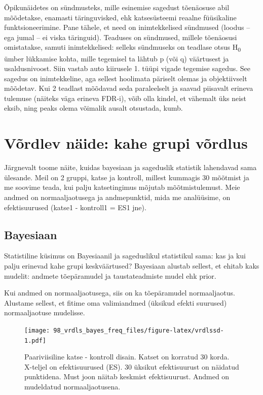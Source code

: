\documentclass[]{book}
\begin{document}
Õpikunäidetes on sündmusteks, mille esinemise sagedust tõenäosuse abil mõõdetakse, enamasti täringuvisked, ehk katsesüsteemi reaalne füüsikaline funktsioneerimine.
Pane tähele, et need on inimtekkelised sündmused (loodus -- ega jumal -- ei viska täringuid).
Teaduses on sündmused, millele tõenäosusi omistatakse, samuti inimtekkelised: selleks sündmuseks on teadlase otsus H\textsubscript{0} ümber lükkamise kohta, mille tegemisel ta lähtub p (või q) väärtusest ja usaldusnivoost.
Siin vastab auto kiirusele 1. tüüpi vigade tegemise sagedus.
See sagedus on inimtekkeline, aga sellest hoolimata päriselt olemas ja objektiivselt mõõdetav.
Kui 2 teadlast mõõdavad seda paraleelselt ja saavad piisavalt erineva tulemuse (näiteks väga erineva FDR-i), võib olla kindel, et vähemalt üks neist eksib, ning peaks olema võimalik ausalt otsustada, kumb.

\hypertarget{vordlev-naide-kahe-grupi-vordlus}{%
\section*{Võrdlev näide: kahe grupi võrdlus}\label{vordlev-naide-kahe-grupi-vordlus}}

Järgnevalt toome näite, kuidas bayesiaan ja sageduslik statistik lahendavad sama ülesande.
Meil on 2 gruppi, katse ja kontroll, millest kummagis 30 mõõtmist ja me soovime teada, kui palju katsetingimus mõjutab mõõtmistulemust.
Meie andmed on normaaljaotusega ja andmepunktid, mida me analüüsime, on efektisuurused (katse1 - kontroll1 = ES1 jne).

\hypertarget{bayesiaan}{%
\subsection*{Bayesiaan}\label{bayesiaan}}

Statistiline küsimus on Bayesiaanil ja sageduslikul statistikul sama: kas ja kui palju erinevad kahe grupi keskväärtused?
Bayesiaan alustab sellest, et ehitab kaks mudelit: andmete tõepäramudel ja taustateadmiste mudel ehk prior.

Kui andmed on normaaljaotusega, siis on ka tõepäramudel normaaljaotus.
Alustame sellest, et fitime oma valimiandmed (üksikud efekti suurused) normaaljaotuse mudelisse.

\begin{figure}
\centering
\texttt{[image: 98\_vrdls\_bayes\_freq\_files/figure-latex/vrdlssd-1.pdf]}
\caption{\label{fig:vrdlssd}Paariviisiline katse - kontroll disain. Katset on korratud 30 korda. X-teljel on efektisuurused (ES). 30 üksikut efektisuurust on näidatud punktidena. Must joon näitab keskmist efektisuurust. Andmed on mudeldatud normaaljaotusena.}
\end{figure}
\end{document}
